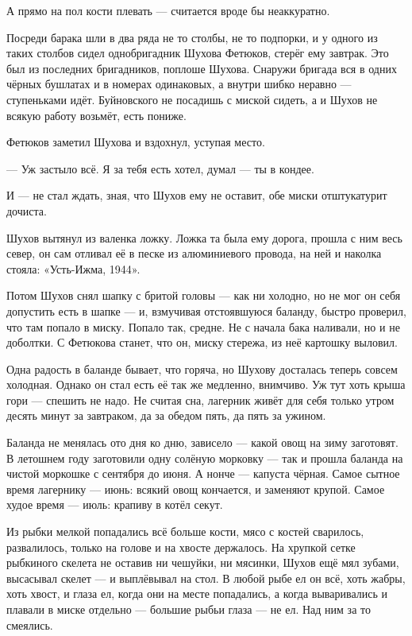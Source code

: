 А прямо на пол кости плевать --- считается вроде бы неаккуратно.

Посреди барака шли в два ряда не то столбы, не то подпорки, и у одного из таких столбов сидел 
однобригадник Шухова Фетюков, стерёг ему завтрак. Это был из последних бригадников, поплоше 
Шухова. Снаружи бригада вся в одних чёрных бушлатах и в номерах одинаковых, а внутри шибко 
неравно --- ступеньками идёт. Буйновского не посадишь с миской сидеть, а и Шухов не всякую 
работу возьмёт, есть пониже.

Фетюков заметил Шухова и вздохнул, уступая место.

--- Уж застыло всё. Я за тебя есть хотел, думал --- ты в кондее.

И --- не стал ждать, зная, что Шухов ему не оставит, обе миски отштукатурит дочиста.

Шухов вытянул из валенка ложку. Ложка та была ему дорога, прошла с ним весь север, он сам 
отливал её в песке из алюминиевого провода, на ней и наколка стояла: «Усть-Ижма, 1944».

Потом Шухов снял шапку с бритой головы --- как ни холодно, но не мог он себя допустить есть в 
шапке --- и, взмучивая отстоявшуюся баланду, быстро проверил, что там попало в миску. Попало 
так, средне. Не с начала бака наливали, но и не доболтки. С Фетюкова станет, что он, миску 
стережа, из неё картошку выловил.

Одна радость в баланде бывает, что горяча, но Шухову досталась теперь совсем холодная. 
Однако он стал есть её так же медленно, внимчиво. Уж тут хоть крыша гори --- спешить не надо. Не 
считая сна, лагерник живёт для себя только утром десять минут за завтраком, да за обедом 
пять, да пять за ужином.

Баланда не менялась ото дня ко дню, зависело --- какой овощ на зиму заготовят. В летошнем году 
заготовили одну солёную морковку --- так и прошла баланда на чистой моркошке с сентября до 
июня. А нонче --- капуста чёрная. Самое сытное время лагернику --- июнь: всякий овощ кончается, и 
заменяют крупой. Самое худое время --- июль: крапиву в котёл секут.

Из рыбки мелкой попадались всё больше кости, мясо с костей сварилось, развалилось, только на 
голове и на хвосте держалось. На хрупкой сетке рыбкиного скелета не оставив ни чешуйки, ни 
мясинки, Шухов ещё мял зубами, высасывал скелет --- и выплёвывал на стол. В любой рыбе ел он 
всё, хоть жабры, хоть хвост, и глаза ел, когда они на месте попадались, а когда вываривались и 
плавали в миске отдельно --- большие рыбьи глаза --- не ел. Над ним за то смеялись.

